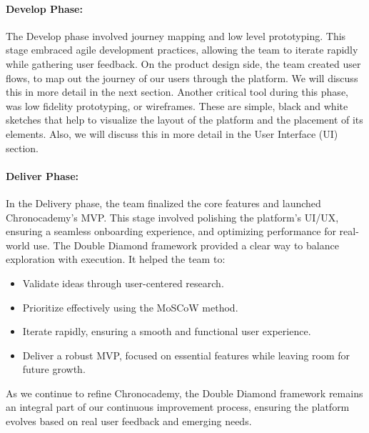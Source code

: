 \paragraph{Develop Phase:}
The Develop phase involved journey mapping and low level prototyping.
This stage embraced agile development practices, allowing the team to iterate rapidly while gathering user feedback.
On the product design side, the team created user flows, to map out the journey of our users through the platform.
We will discuss this in more detail in the next section.\newline
Another critical tool during this phase, was low fidelity prototyping, or wireframes.
These are simple, black and white sketches that help to visualize the layout of the platform and the placement of its elements.
Also, we will discuss this in more detail in the User Interface (UI) section.\newline
\paragraph{Deliver Phase:}
In the Delivery phase, the team finalized the core features and launched Chronocademy's MVP. This stage involved polishing the platform’s UI/UX, ensuring a seamless onboarding experience, and optimizing performance for real-world use.
The Double Diamond framework provided a clear way to balance exploration with execution.
It helped the team to:
\begin{itemize}
\item Validate ideas through user-centered research.
\item Prioritize effectively using the MoSCoW method.
\item Iterate rapidly, ensuring a smooth and functional user experience.
\item Deliver a robust MVP, focused on essential features while leaving room for future growth.
\end{itemize}
As we continue to refine Chronocademy, the Double Diamond framework remains an integral part of our continuous improvement process, ensuring the platform evolves based on real user feedback and emerging needs.